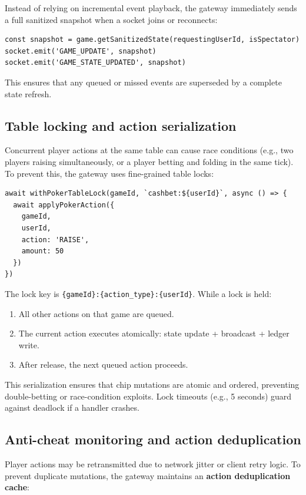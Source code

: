 \documentclass[11pt,a4paper]{article}
\begin{document}
Instead of relying on incremental event playback, the gateway immediately sends a full sanitized snapshot when a socket joins or reconnects:

\begin{verbatim}
const snapshot = game.getSanitizedState(requestingUserId, isSpectator)
socket.emit('GAME_UPDATE', snapshot)
socket.emit('GAME_STATE_UPDATED', snapshot)
\end{verbatim}

\noindent This ensures that any queued or missed events are superseded by a complete state refresh.

\subsection{Table locking and action serialization}

Concurrent player actions at the same table can cause race conditions (e.g., two players raising simultaneously, or a player betting and folding in the same tick). To prevent this, the gateway uses fine-grained table locks:

\begin{verbatim}
await withPokerTableLock(gameId, `cashbet:${userId}`, async () => {
  await applyPokerAction({
    gameId,
    userId,
    action: 'RAISE',
    amount: 50
  })
})
\end{verbatim}

\noindent The lock key is \texttt{\{gameId\}:\{action\_type\}:\{userId\}}. While a lock is held:

\begin{enumerate}
\item All other actions on that game are queued.
\item The current action executes atomically: state update + broadcast + ledger write.
\item After release, the next queued action proceeds.
\end{enumerate}

This serialization ensures that chip mutations are atomic and ordered, preventing double-betting or race-condition exploits. Lock timeouts (e.g., 5 seconds) guard against deadlock if a handler crashes.

\subsection{Anti-cheat monitoring and action deduplication}

Player actions may be retransmitted due to network jitter or client retry logic. To prevent duplicate mutations, the gateway maintains an \textbf{action deduplication cache}:
\end{document}
